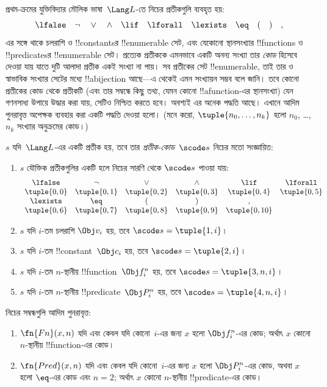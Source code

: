 \documentclass[../../../include/open-logic-section]{subfiles}
\begin{document}

প্রথম-ক্রমের যুক্তিবিদ্যার মৌলিক ভাষা~$\Lang L$-তে নিচের প্রতীকগুলি ব্যবহৃত হয়:
\[
\lfalse \quad \lnot \quad \lor \quad \land \quad \lif \quad \lforall
\quad \lexists \quad \eq \quad ( \quad ) \quad ,
\]
এর সঙ্গে থাকে চলরাশি ও !!{constant}sর !!{enumerable} সেট, এবং যেকোনো
স্থানসংখ্যার !!{function}s ও !!{predicate}sর !!{enumerable} সেট। প্রত্যেক
প্রতীককে এমনভাবে একটি অনন্য সংখ্যা তার \emph{কোড} হিসেবে দেওয়া যায় যাতে
দুটি আলাদা প্রতীক একই সংখ্যা না পায়। সব প্রতীকের সেট !!{enumerable}, তাই তার
ও স্বাভাবিক সংখ্যার সেটের মধ্যে !!a{bijection} আছে—এ থেকেই এমন সংখ্যায়ন সম্ভব
বলে জানি। তবে কোনো প্রতীকের কোড থেকে প্রতীকটি (এবং তার সম্বন্ধে কিছু তথ্য,
যেমন কোনো !!a{function}-এর স্থানসংখ্যা) যেন গণনসাধ্য উপায়ে উদ্ধার করা যায়,
সেটিও নিশ্চিত করতে হবে। অবশ্যই এর অনেক পদ্ধতি আছে। এখানে আদিম পুনরাবৃত্ত
অপেক্ষক ব্যবহার করা একটি পদ্ধতি দেওয়া হলো। (মনে করো,
$\tuple{n_0, \dots, n_k}$ হলো $n_0$, \dots, $n_k$ সংখ্যার অনুক্রমের কোড।)

\begin{defn}
$s$ যদি~$\Lang L$-এর একটি প্রতীক হয়, তবে তার \emph{প্রতীক-কোড}~$\scode s$
নিচের মতো সংজ্ঞায়িত:
\begin{enumerate}
\item $s$ যৌক্তিক প্রতীকগুলির একটি হলে নিচের সারণি থেকে $\scode s$ পাওয়া যায়:
\[
\begin{array}{cccccccccc}
  \lfalse & \lnot & \lor & \land & \lif & \lforall \\
\tuple{0, 0} & \tuple{0, 1} & \tuple{0, 2} & \tuple{0, 3} &
\tuple{0, 4} & \tuple{0, 5} \\
\lexists & \eq & ( & ) & ,\\
\tuple{0, 6} & \tuple{0, 7} &
\tuple{0, 8} & \tuple{0, 9} & \tuple{0, 10}
\end{array}
\]
\item $s$ যদি $i$-তম চলরাশি $\Obj v_i$ হয়, তবে $\scode s = \tuple{1, i}$।
\item $s$ যদি $i$-তম !!{constant}~$\Obj c_i$ হয়, তবে
  $\scode s = \tuple{2, i}$।
\item $s$ যদি $i$-তম $n$-স্থানীয় !!{function}~$\Obj f_i^n$ হয়, তবে
  $\scode s = \tuple{3, n, i}$।
\item $s$ যদি $i$-তম $n$-স্থানীয় !!{predicate}~$\Obj P_i^n$ হয়, তবে
  $\scode s = \tuple{4, n, i}$।
\end{enumerate}
\end{defn}

\begin{prop}
নিচের সম্বন্ধগুলি আদিম পুনরাবৃত্ত:
\begin{enumerate}
\item $\fn{Fn}(x, n)$ যদি এবং কেবল যদি কোনো~$i$-এর জন্য $x$ হলো
  $\Obj f^n_i$-এর কোড; অর্থাৎ $x$ কোনো $n$-স্থানীয় !!{function}-এর কোড।
\item $\fn{Pred}(x, n)$ যদি এবং কেবল যদি কোনো~$i$-এর জন্য $x$ হলো
  $\Obj P^n_i$-এর কোড, অথবা $x$ হলো $\eq$-এর কোড এবং $n = 2$; অর্থাৎ $x$
  কোনো $n$-স্থানীয় !!{predicate}-এর কোড।
\end{enumerate}
\end{prop}
\end{document}
